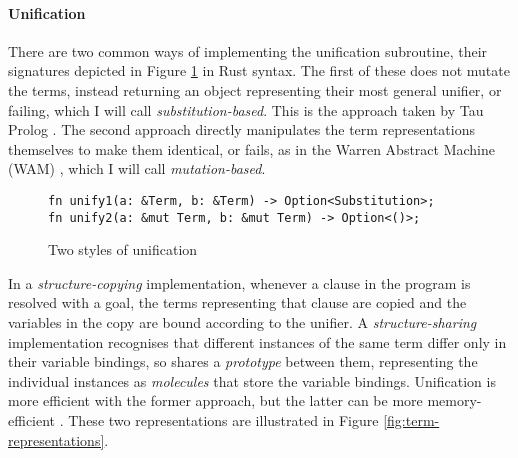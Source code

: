 \paragraph{Unification} There are two common ways of implementing the unification subroutine, their signatures depicted in Figure \ref{fig:unification-impl} in Rust syntax. The first of these does not mutate the terms, instead returning an object representing their most general unifier, or failing, which I will call \emph{substitution-based}. This is the approach taken by Tau Prolog \cite{riazaTauPrologProlog2024}. The second approach directly manipulates the term representations themselves to make them identical, or fails, as in the Warren Abstract Machine (WAM) \cite{warrenAbstractPrologInstruction1983}, which I will call \emph{mutation-based}.

\begin{figure}[H]
\centering
\begin{verbatim}
fn unify1(a: &Term, b: &Term) -> Option<Substitution>;
fn unify2(a: &mut Term, b: &mut Term) -> Option<()>;
\end{verbatim}
\caption{Two styles of unification}
\label{fig:unification-impl}
\end{figure}

In a \emph{structure-copying} implementation, whenever a clause in the program is resolved with a goal, the terms representing that clause are copied and the variables in the copy are bound according to the unifier. A \emph{structure-sharing} implementation recognises that different instances of the same term differ only in their variable bindings, so shares a \emph{prototype} between them, representing the individual instances as \emph{molecules} that store the variable bindings. Unification is more efficient with the former approach, but the latter can be more memory-efficient \cite{linewtermrepresentation1998}. These two representations are illustrated in Figure \ref{fig:term-representations}.

